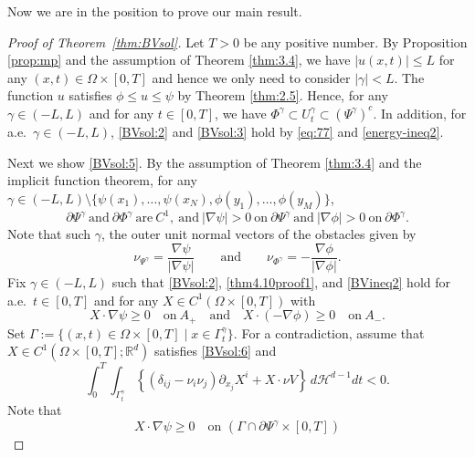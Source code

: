\documentclass{amsart}
\theoremstyle{definition}
\def\R{{\mathbb{R}}}
\begin{document}
Now we are in the position to prove our main result.
\begin{proof}[Proof of Theorem~\ref{thm:BVsol}]
Let $T>0$ be any positive number.
By Proposition \ref{prop:mp} and the assumption of Theorem \ref{thm:3.4}, we have $|u(x,t)| \leq L$ for any $(x,t) \in \Omega\times [0,T]$ and hence we only need to consider $|\gamma|<L$.
The function $u$ satisfies $\phi \leq u \leq \psi$ by Theorem \ref{thm:2.5}.
Hence, for any $\gamma \in (-L,L)$ and for any $t\in [0,T]$, we have $\Phi ^\gamma \subset U_t ^\gamma \subset (\Psi ^\gamma)^c$.
In addition, for a.e.\ $\gamma \in (-L,L)$, \eqref{BVsol:2} and \eqref{BVsol:3} hold by 
 \eqref{eq:77} and 
\eqref{energy-ineq2}.

Next we show \eqref{BVsol:5}. 
By the assumption of Theorem \ref{thm:3.4} and the implicit function theorem, for any $\gamma \in (-L,L)\setminus \{ \psi(x_1),\dots,\psi (x_N), \phi(y_1),\dots, \phi(y_M) \}$,
\begin{equation}\label{thm4.10proof1}
\partial \Psi^\gamma \ \text{and} \ \partial \Phi^\gamma \ \text{are} \ C^1, \ \text{and} \ |\nabla \psi|>0 \ \text{on} \ \partial \Psi^\gamma \ \text{and} \ |\nabla \phi|>0 \ \text{on} \ \partial \Phi^\gamma.
\end{equation}
Note that such $\gamma$, the outer unit normal vectors of the obstacles given by 
\begin{equation}\label{obstacle-normal}
\nu_{\Psi^\gamma} = \frac{\nabla \psi}{|\nabla \psi|}
\qquad
\text{and}
\qquad
\nu_{\Phi^\gamma} = -\frac{\nabla \phi}{|\nabla \phi|}.
\end{equation}
Fix $\gamma \in (-L,L)$ such that \eqref{BVsol:2}, \eqref{thm4.10proof1}, and \eqref{BVineq2} hold for a.e.\ $t \in [0,T]$ and for any $X \in C^1 (\Omega \times [0,T])$ with
\[
X\cdot \nabla \psi \geq 0 \quad \text{on} \ A_+
\quad
\text{and}
\quad
X \cdot (-\nabla \phi) \geq 0 \quad \text{on} \ A_-.
\]
Set $\Gamma:=\{ (x,t) \in \Omega \times [0,T] \mid x \in \Gamma_t ^\gamma \}$.
For a contradiction, assume that $X \in C^1 (\Omega \times [0,T];\R^d)$ satisfies \eqref{BVsol:6}
and 
\begin{equation}\label{eq:mainthm:contradiction}
    \int_0 ^T \int_{\Gamma _t ^\gamma}
\left\{
\left( \delta_{ij} - \nu_i \nu_j \right)
\partial_{x_j} X^i +
X \cdot \nu V 
\right\} \, d \mathcal{H}^{d-1} dt<0.
\end{equation}
Note that 
\begin{equation}\label{admissible}
	X\cdot \nabla \psi \geq 0 \quad \text{on } (\Gamma \cap \partial \Psi ^\gamma \times [0,T])

\end{equation}
\end{proof}
\end{document}
